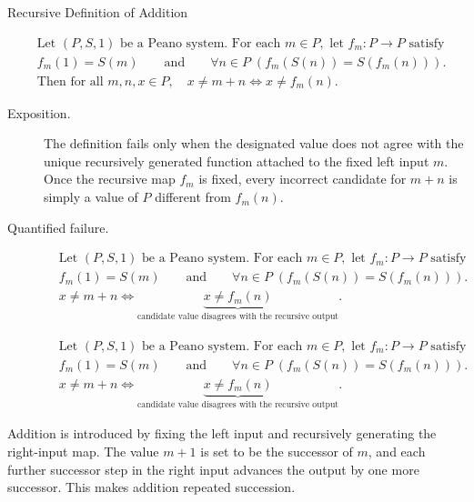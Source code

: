 \begin{topicbox}{Recursive Definition of Addition}
\begin{remark*}
\[
\begin{aligned}
&\text{Let } (P,S,1) \text{ be a Peano system. For each } m \in P,
\text{ let } f_m : P \to P \text{ satisfy}\\
&f_m(1)=S(m)
\qquad\text{and}\qquad
\forall n \in P\;(f_m(S(n))=S(f_m(n))).\\
&\text{Then for all } m,n,x \in P,\quad x \neq m+n
\Longleftrightarrow
x \neq f_m(n).
\end{aligned}
\]
\end{remark*}

\begin{remark*}
\begin{description}
  \item[Exposition.]
  The definition fails only when the designated value does not agree with the
  unique recursively generated function attached to the fixed left input $m$.
  Once the recursive map $f_m$ is fixed, every incorrect candidate for $m+n$
  is simply a value of $P$ different from $f_m(n)$.
  \item[Quantified failure.]
  \[
  \begin{aligned}
  &\text{Let } (P,S,1) \text{ be a Peano system. For each } m \in P,
  \text{ let } f_m : P \to P \text{ satisfy}\\
  &f_m(1)=S(m)
  \qquad\text{and}\qquad
  \forall n \in P\;(f_m(S(n))=S(f_m(n))).\\
  &x \neq m+n
  \Longleftrightarrow
  \underbrace{x \neq f_m(n)}_{\text{candidate value disagrees with the recursive output}}.
  \end{aligned}
  \]

\[
  \begin{aligned}
  &\text{Let } (P,S,1) \text{ be a Peano system. For each } m \in P,
  \text{ let } f_m : P \to P \text{ satisfy}\\
  &f_m(1)=S(m)
  \qquad\text{and}\qquad
  \forall n \in P\;(f_m(S(n))=S(f_m(n))).\\
  &x \neq m+n
  \Longleftrightarrow
  \underbrace{x \neq f_m(n)}_{\text{candidate value disagrees with the recursive output}}.
  \end{aligned}
  \]
\end{description}
\end{remark*}

\begin{remark*}[Interpretation]
Addition is introduced by fixing the left input and recursively generating the
right-input map. The value $m+1$ is set to be the successor of $m$, and each
further successor step in the right input advances the output by one more
successor. This makes addition repeated succession.
\end{remark*}


\end{topicbox}
